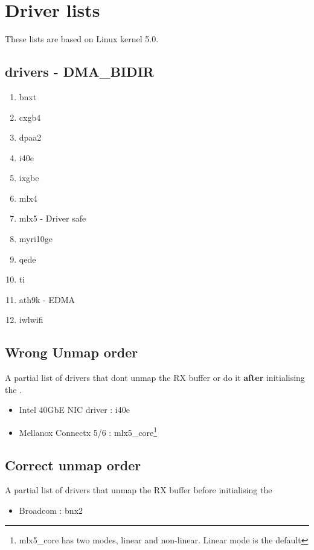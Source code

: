 \newpage
\section{Driver lists}
These lists are based on Linux kernel 5.0. 
\subsection{drivers - DMA\_BIDIR}
\begin{enumerate}
    \item bnxt
    \item cxgb4
    \item dpaa2
    \item i40e
    \item ixgbe
    \item mlx4
    \item mlx5 - Driver safe
    \item myri10ge
    \item qede
    \item ti
    \item ath9k - EDMA
    \item iwlwifi
\end{enumerate}
\subsection{Wrong Unmap order}{\label{apndx:wrong_order}}
A partial list of drivers that dont unmap the RX buffer or do it \textbf{after} initialising the \shinfo.
\begin{itemize}

    \item Intel 40GbE NIC driver : i40e
    \item Mellanox Connectx 5/6 : mlx5\_core\footnote{mlx5\_core has two modes, linear and non-linear. Linear mode is the default}
\end{itemize}
\subsection{Correct unmap order}
{\label{apndx:correct_order}}
A partial list of drivers that unmap the RX buffer before initialising the \shinfo 
\begin{itemize}
    \item Broadcom : bnx2
\end{itemize}
